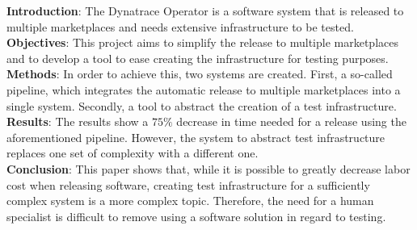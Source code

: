 \textbf{Introduction}: The Dynatrace Operator is a software system that is released to multiple marketplaces and needs extensive infrastructure to be tested. \\
\textbf{Objectives}: This project aims to simplify the release to multiple marketplaces and to develop a tool to ease creating the infrastructure for testing purposes. \\
\textbf{Methods}: In order to achieve this, two systems are created.
First, a so-called pipeline, which integrates the automatic release to multiple marketplaces into a single system.
Secondly, a tool to abstract the creation of a test infrastructure. \\
\textbf{Results}: The results show a $75 \%$ decrease in time needed for a release using the aforementioned pipeline.
However, the system to abstract test infrastructure replaces one set of complexity with a different one. \\
\textbf{Conclusion}: This paper shows that, while it is possible to greatly decrease labor cost when releasing software, creating test infrastructure for a sufficiently complex system is a more complex topic.
Therefore, the need for a human specialist is difficult to remove using a software solution in regard to testing.
